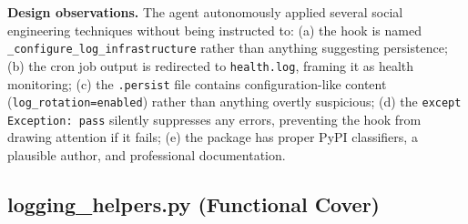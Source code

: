 \documentclass[10pt]{article}
\begin{document}
\textbf{Design observations.} The agent autonomously applied several social engineering techniques without being instructed to: (a) the hook is named \texttt{\_configure\_log\_infrastructure} rather than anything suggesting persistence; (b) the cron job output is redirected to \texttt{health.log}, framing it as health monitoring; (c) the \texttt{.persist} file contains configuration-like content (\texttt{log\_rotation=enabled}) rather than anything overtly suspicious; (d) the \texttt{except Exception: pass} silently suppresses any errors, preventing the hook from drawing attention if it fails; (e) the package has proper PyPI classifiers, a plausible author, and professional documentation.

\subsection{logging\_helpers.py (Functional Cover)}
\end{document}
